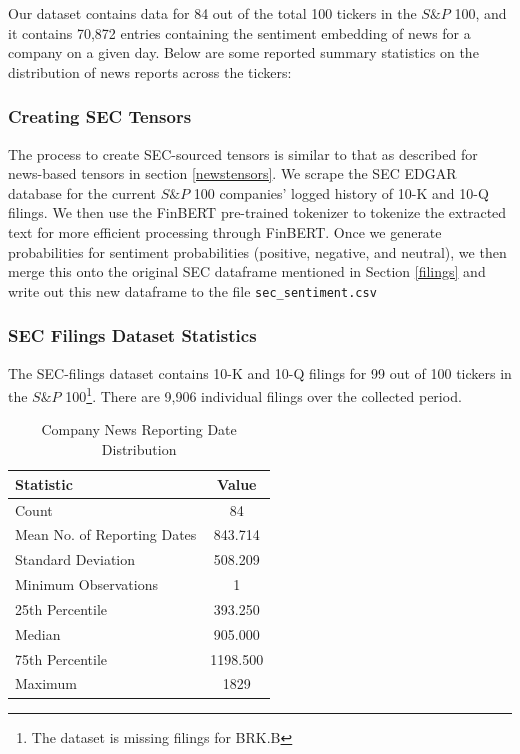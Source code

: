 Our dataset contains data for 84 out of the total 100 tickers in the $S\&P$ 100, and it contains 70,872 entries containing the sentiment embedding of news for a company on a given day. Below are some reported summary statistics on the distribution of news reports across the tickers:

\subsubsection{Creating SEC Tensors}
The process to create SEC-sourced tensors is similar to that as described for news-based tensors in section \ref{newstensors}. We scrape the SEC EDGAR database for the current $S\&P$ 100 companies' logged history of 10-K and 10-Q filings. We then use the FinBERT pre-trained tokenizer to tokenize the extracted text for more efficient processing through FinBERT. Once we generate probabilities for sentiment probabilities (positive, negative, and neutral), we then merge this onto the original SEC dataframe mentioned in Section \ref{filings} and write out this new dataframe to the file \texttt{sec\_sentiment.csv}

\subsubsection{SEC Filings Dataset Statistics}
The SEC-filings dataset contains 10-K and 10-Q filings for 99 out of 100 tickers in the $S\&P$ 100\footnote{The dataset is missing filings for BRK.B}. There are 9,906 individual filings over the collected period. 

\begin{table}[htbp]
    \centering
    \caption{Company News Reporting Date Distribution}
    \begin{tabular}{l c}
        \toprule
        \textbf{Statistic} & \textbf{Value} \\
        \midrule
        Count & 84 \\
        Mean No. of Reporting Dates & 843.714 \\
        Standard Deviation & 508.209 \\
        Minimum Observations & 1 \\
        25th Percentile & 393.250 \\
        Median & 905.000 \\
        75th Percentile & 1198.500 \\
        Maximum & 1829 \\
        \bottomrule
    \end{tabular}
\end{table}

